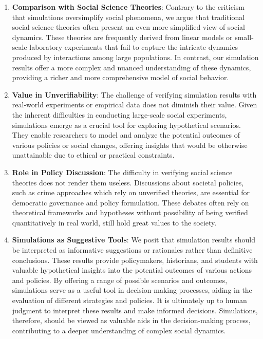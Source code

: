 \documentclass{article}
\begin{document}
\begin{enumerate}
\item\textbf{Comparison with Social Science Theories}: Contrary to the criticism that simulations oversimplify social phenomena, we argue that traditional social science theories often present an even more simplified view of social dynamics. These theories are frequently derived from linear models or small-scale laboratory experiments that fail to capture the intricate dynamics produced by interactions among large populations. In contrast, our simulation results offer a more complex and nuanced understanding of these dynamics, providing a richer and more comprehensive model of social behavior.
\item\textbf{Value in Unverifiability}: The challenge of verifying simulation results with real-world experiments or empirical data does not diminish their value. Given the inherent difficulties in conducting large-scale social experiments, simulations emerge as a crucial tool for exploring hypothetical scenarios. They enable researchers to model and analyze the potential outcomes of various policies or social changes, offering insights that would be otherwise unattainable due to ethical or practical constraints.
\item\textbf{Role in Policy Discussion}: The difficulty in verifying social science theories does not render them useless. Discussions about societal policies, such as crime approaches which rely on unverified theories, are essential for democratic governance and policy formulation. These debates often rely on theoretical frameworks and hypotheses without possibility of being verified quantitatively in real world, still hold great values to the society.
\item\textbf{Simulations as Suggestive Tools}: We posit that simulation results should be interpreted as informative suggestions or rationales rather than definitive conclusions. These results provide policymakers, historians, and students with valuable hypothetical insights into the potential outcomes of various actions and policies. By offering a range of possible scenarios and outcomes, simulations serve as a useful tool in decision-making processes, aiding in the evaluation of different strategies and policies. It is ultimately up to human judgment to interpret these results and make informed decisions. Simulations, therefore, should be viewed as valuable aids in the decision-making process, contributing to a deeper understanding of complex social dynamics.
\end{enumerate}
\end{document}
